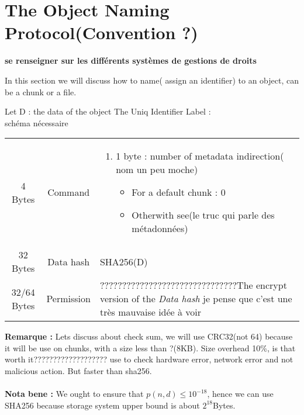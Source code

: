 \section{The Object Naming Protocol(Convention ?)}

\textbf{se renseigner sur les différents systèmes de gestions de droits}

In this section we will discuss how to name( assign an identifier) to an object, can be a chunk or a file.

Let D : the data of the object
The Uniq Identifier Label :\\

schéma nécessaire

\begin{tabular}{c|c|p{}|}
4 Bytes & Command & 
\begin{enumerate}
 \item 1 byte : number of metadata indirection( nom un peu moche)
 \begin{itemize}
  \item For a default chunk : 0
  \item Otherwith see(le truc qui parle des métadonnées)
 \end{itemize}

\end{enumerate}\\
32 Bytes & Data hash & SHA256(D)\\

32/64 Bytes & Permission & ???????????????????????????????The encrypt version of the \textit{Data hash} je pense que c'est une très mauvaise idée à voir\\
\end{tabular}
\textbf{Remarque :}
Lets discuss about check sum, we will use CRC32(not 64) because it will be use on chunks, 
with a size less than ?(8KB).
Size overhead 10\%, is that worth it??????????????????? use to check hardware error, network 
error and not malicious action. But faster than sha256.\\\\
\textbf{Nota bene :}
We ought to ensure that $p(n,d) \leq 10^{-18}$, hence we can use SHA256 because storage system 
upper bound is about $2^{18}$Bytes.

